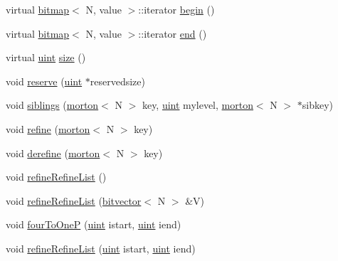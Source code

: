 \begin{DoxyCompactItemize}
\item 
virtual \mbox{\hyperlink{definitions_8h_acf2396ef4de9eb8a6324b9f1a624ea85}{bitmap}}$<$ N, value $>$\+::iterator \mbox{\hyperlink{classTree_aa9a32f0e006ee027c037669b8b1c7d01}{begin}} ()
\item 
virtual \mbox{\hyperlink{definitions_8h_acf2396ef4de9eb8a6324b9f1a624ea85}{bitmap}}$<$ N, value $>$\+::iterator \mbox{\hyperlink{classTree_a780c144c3fa4f648e7c616d7010721b0}{end}} ()
\item 
virtual \mbox{\hyperlink{definitions_8h_a69aa29b598b851b0640aa225a9e5d61d}{uint}} \mbox{\hyperlink{classTree_a8af31c93aa821f0d853e920bcba1829a}{size}} ()
\item 
void \mbox{\hyperlink{classTree_aca5c23bba3aa776b573e4f81d3ada031}{reserve}} (\mbox{\hyperlink{definitions_8h_a69aa29b598b851b0640aa225a9e5d61d}{uint}} $\ast$reservedsize)
\item 
void \mbox{\hyperlink{classTree_a33f60f27d0cf871b68bf2ed82638d1c7}{siblings}} (\mbox{\hyperlink{definitions_8h_af8682350bd8bb38ee9023f7a0a310add}{morton}}$<$ N $>$ key, \mbox{\hyperlink{definitions_8h_a69aa29b598b851b0640aa225a9e5d61d}{uint}} mylevel, \mbox{\hyperlink{definitions_8h_af8682350bd8bb38ee9023f7a0a310add}{morton}}$<$ N $>$ $\ast$sibkey)
\item 
void \mbox{\hyperlink{classTree_af2b416c08ae9132bfd466fe3fa288033}{refine}} (\mbox{\hyperlink{definitions_8h_af8682350bd8bb38ee9023f7a0a310add}{morton}}$<$ N $>$ key)
\item 
void \mbox{\hyperlink{classTree_ab570c49c859bb12ab22f29eb1fb51e0f}{derefine}} (\mbox{\hyperlink{definitions_8h_af8682350bd8bb38ee9023f7a0a310add}{morton}}$<$ N $>$ key)
\item 
void \mbox{\hyperlink{classTree_a4b8830fdf12cdd981a853937b6289816}{refine\+Refine\+List}} ()
\item 
void \mbox{\hyperlink{classTree_a44a82b0e29d139138605cd55427bb0bd}{refine\+Refine\+List}} (\mbox{\hyperlink{definitions_8h_a55821d7929f3f16aaf1466129c209492}{bitvector}}$<$ N $>$ \&V)
\item 
void \mbox{\hyperlink{classTree_a79d852515f810c7d67d3b8f7d157a03b}{four\+To\+OneP}} (\mbox{\hyperlink{definitions_8h_a69aa29b598b851b0640aa225a9e5d61d}{uint}} istart, \mbox{\hyperlink{definitions_8h_a69aa29b598b851b0640aa225a9e5d61d}{uint}} iend)
\item 
void \mbox{\hyperlink{classTree_a5e5fe24ceea87aeaa4931eb770e63484}{refine\+Refine\+List}} (\mbox{\hyperlink{definitions_8h_a69aa29b598b851b0640aa225a9e5d61d}{uint}} istart, \mbox{\hyperlink{definitions_8h_a69aa29b598b851b0640aa225a9e5d61d}{uint}} iend)

\end{DoxyCompactItemize}
